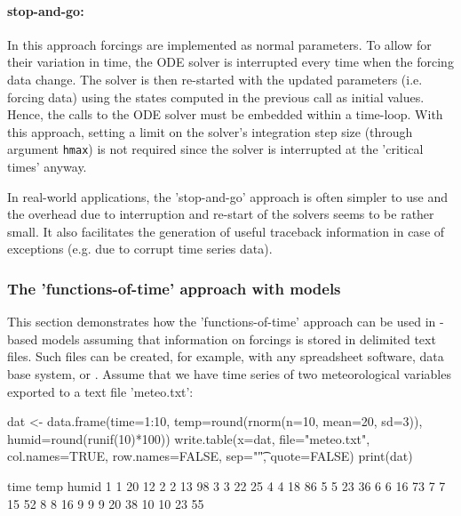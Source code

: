 \documentclass[onecolumn]{article}
\begin{document}
\paragraph{stop-and-go:} In this approach forcings are implemented as normal parameters. To allow for their variation in time, the ODE solver is interrupted every time when the forcing data change. The solver is then re-started with the updated parameters (i.e. forcing data) using the states computed in the previous call as initial values. Hence, the calls to the ODE solver must be embedded within a time-loop. With this approach, setting a limit on the solver's integration step size (through argument \verb|hmax|) is not required since the solver is interrupted at the 'critical times' anyway.

In real-world applications, the 'stop-and-go' approach is often simpler to use and the overhead due to interruption and re-start of the solvers seems to be rather small. It also facilitates the generation of useful traceback information in case of exceptions (e.g. due to corrupt time series data).

\subsubsection{The 'functions-of-time' approach with  models}

This section demonstrates how the 'functions-of-time' approach can be used in -based models assuming that information on forcings is stored in delimited text files. Such files can be created, for example, with any spreadsheet software, data base system, or . Assume that we have time series of two meteorological variables exported to a text file 'meteo.txt':

\begin{Schunk}
\begin{Sinput}
 dat <- data.frame(time=1:10, temp=round(rnorm(n=10, mean=20, sd=3)),
   humid=round(runif(10)*100))
 write.table(x=dat, file="meteo.txt", col.names=TRUE,
   row.names=FALSE, sep="\t", quote=FALSE)
 print(dat)
\end{Sinput}
\begin{Soutput}
   time temp humid
1     1   20    12
2     2   13    98
3     3   22    25
4     4   18    86
5     5   23    36
6     6   16    73
7     7   15    52
8     8   16     9
9     9   20    38
10   10   23    55
\end{Soutput}
\end{Schunk}
\end{document}
